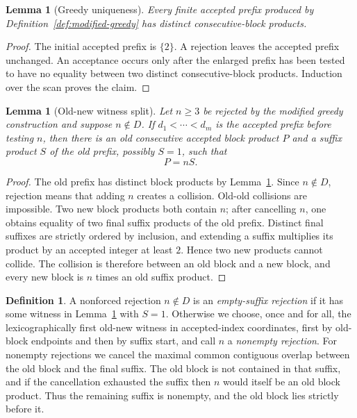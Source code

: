 \documentclass[11pt]{article}
\newtheorem{lemma}[theorem]{Lemma}
\theoremstyle{definition}
\newtheorem{definition}[theorem]{Definition}
\newcommand{\1}{\mathbf 1}
\begin{document}
\begin{lemma}[Greedy uniqueness]\label{lem:greedy-unique}
Every finite accepted prefix produced by Definition~\ref{def:modified-greedy}
has distinct consecutive-block products.
\end{lemma}

\begin{proof}
The initial accepted prefix is \(\{2\}\).  A rejection leaves the accepted
prefix unchanged.  An acceptance occurs only after the enlarged prefix has
been tested to have no equality between two distinct consecutive-block
products.  Induction over the scan proves the claim.
\end{proof}

\begin{lemma}[Old-new witness split]\label{lem:witness-split}
Let \(n\ge3\) be rejected by the modified greedy construction and suppose
\(n\notin D\).  If \(d_1<\cdots<d_m\) is the accepted prefix before testing
\(n\), then there is an old consecutive accepted block product \(P\) and a
suffix product \(S\) of the old prefix, possibly \(S=1\), such that
\[
  P=nS.
\]
\end{lemma}

\begin{proof}
The old prefix has distinct block products by Lemma~\ref{lem:greedy-unique}.
Since \(n\notin D\), rejection means that adding \(n\) creates a collision.
Old-old collisions are impossible.  Two new block products both contain \(n\);
after cancelling \(n\), one obtains equality of two final suffix products of
the old prefix.  Distinct final suffixes are strictly ordered by inclusion,
and extending a suffix multiplies its product by an accepted integer at least
\(2\).  Hence two new products cannot collide.  The collision is therefore
between an old block and a new block, and every new block is \(n\) times an
old suffix product.
\end{proof}

\begin{definition}
A nonforced rejection \(n\notin D\) is an \emph{empty-suffix rejection} if it
has some witness in Lemma~\ref{lem:witness-split} with \(S=1\).  Otherwise we
choose, once and for all, the lexicographically first old-new witness in
accepted-index coordinates, first by old-block endpoints and then by suffix
start, and call \(n\) a \emph{nonempty rejection}.  For nonempty rejections we
cancel the maximal common contiguous overlap between the old block and the
final suffix.  The old block is not contained in that suffix, and if the
cancellation exhausted the suffix then \(n\) would itself be an old block
product.  Thus the remaining suffix is nonempty, and the old block lies
strictly before it.
\end{definition}
\end{document}
